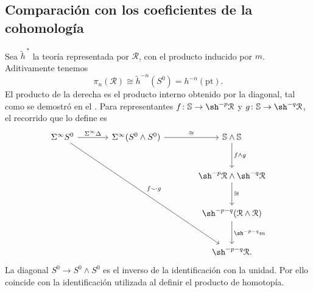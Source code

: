 \subsection{Comparación con los coeficientes de la cohomología}
Sea $\widetilde h^{\,*}$ la teoría representada por $\mathcal R$, con el producto inducido por $m$. Aditivamente tenemos
\[
\pi_n(\mathcal R)\cong\widetilde h^{-n}(S^0)=h^{-n}(\mathrm{pt}).
\]
El producto de la derecha es el producto interno obtenido por la diagonal, tal como se demostró en el . Para representantes $f\colon\mathbb S\to\sh^{-p}\mathcal R$ y $g\colon\mathbb S\to\sh^{-q}\mathcal R$, el recorrido que lo define es
\[
\begin{tikzcd}[column sep=large,row sep=large]
\Sigma^\infty S^0\arrow[r,"\Sigma^\infty\Delta"]\arrow[dddrr,"f\smile g",description]&
\Sigma^\infty(S^0\wedge S^0)\arrow[r,"\cong"]&\mathbb S\wedge\mathbb S\arrow[d,"f\wedge g"]\\
&&\sh^{-p}\mathcal R\wedge\sh^{-q}\mathcal R\arrow[d,"\cong"]\\
&&\sh^{-p-q}(\mathcal R\wedge\mathcal R)\arrow[d,"\sh^{-p-q}m"]\\
&&\sh^{-p-q}\mathcal R.
\end{tikzcd}
\]
La diagonal $S^0\to S^0\wedge S^0$ es el inverso de la identificación con la unidad. Por ello coincide con la identificación utilizada al definir el producto de homotopía.


